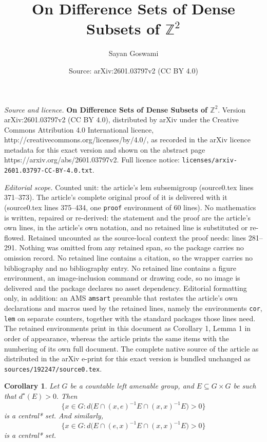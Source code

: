 \documentclass[10pt,a4paper]{amsart}
\title{{\bf On Difference Sets of Dense Subsets of $\mathbb{Z}^2$}}
\author{Sayan Goswami}
\date{Source: arXiv:2601.03797v2 (CC BY 4.0)}
\newtheorem{cor}{Corollary}
\begin{document}
\maketitle

\noindent\emph{Source and licence.} {\bf On Difference Sets of Dense Subsets of $\mathbb{Z}^2$}. Version arXiv:2601.03797v2 (CC BY 4.0), distributed by arXiv under the Creative Commons Attribution 4.0 International licence, http://creativecommons.org/licenses/by/4.0/, as recorded in the arXiv licence metadata for this exact version and shown on the abstract page https://arxiv.org/abs/2601.03797v2. Full licence notice: \texttt{licenses/arxiv-2601.03797-CC-BY-4.0.txt}.\par\smallskip

\noindent\textit{Editorial scope.} Counted unit: the article's lem subsemigroup (source0.tex lines 371--373). The article's complete original proof of it is delivered with it (source0.tex lines 375--434, one \texttt{proof} environment of 60 lines). No mathematics is written, repaired or re-derived: the statement and the proof are the article's own lines, in the article's own notation, and no retained line is substituted or re-flowed.  Retained uncounted as the source-local context the proof needs: lines 281--291.  Nothing was omitted from any retained span, so the package carries no omission record.  No retained line contains a citation, so the wrapper carries no bibliography and no bibliography entry.  No retained line contains a figure environment, an image-inclusion command or drawing code, so no image is delivered and the package declares no asset dependency.  Editorial formatting only, in addition: an AMS \texttt{amsart} preamble that restates the article's own declarations and macros used by the retained lines, namely the environments \texttt{cor}, \texttt{lem} on separate counters, together with the standard packages those lines need.  The retained environments print in this document as Corollary 1, Lemma 1 in order of appearance, whereas the article prints the same items with the numbering of its own full document.  The complete native source of the article as distributed in the arXiv e-print for this exact version is bundled unchanged as \texttt{sources/192247/source0.tex}.
\begin{cor}\label{corfirst}
   Let $G$ be a countable left amenable group, and $E\subseteq G\times G$ be such that $d^\star (E)>0.$ Then 
\[
\{x\in G: d\bigl(E \cap (x,e)^{-1}E \cap (x,x)^{-1}E\bigr) > 0\}
\]
is a central* set. And similarly,
\[
\{x\in G: d\bigl(E \cap (e,x)^{-1}E \cap (x,x)^{-1}E\bigr) > 0\}
\]
is a central* set.
\end{cor}
\end{document}
